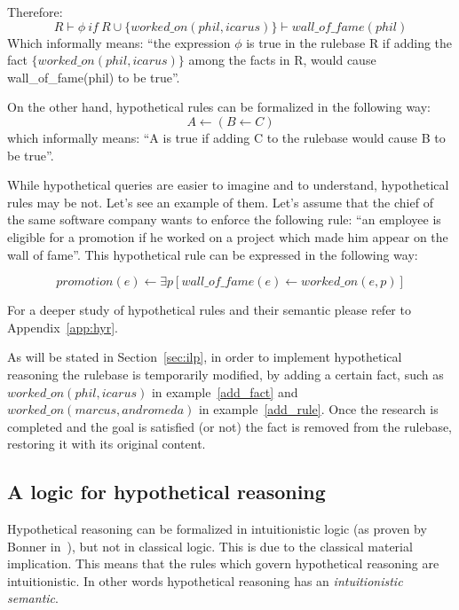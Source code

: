 Therefore:
\begin{equation}
  \label{add_fact}
  R \vdash \phi\ if\   R \cup \{worked\_on(phil, icarus)\} \vdash wall\_of\_fame(phil)
\end{equation}
Which informally means: ``the expression $\phi$ is true in the rulebase R if
adding the fact $\{worked\_on(phil, icarus)\}$ among the facts in R, would cause wall\_of\_fame(phil)
to be true''.

On the other hand, hypothetical rules can be formalized in the following way:
\begin{equation}
  A \leftarrow (B \leftarrow C)
\end{equation}
which informally means: ``A is true if adding C to the rulebase would cause B to be true''.

While hypothetical queries are easier to imagine and to understand, hypothetical rules may be not.
Let's see an example of them. Let's assume that the chief of the same software company
wants to enforce the following rule: ``an employee is eligible for a promotion if
he worked on a project which made him appear on the wall of fame''. This
hypothetical rule can be expressed in the following way:

\begin{equation}
  \label{add_rule}
  promotion(e) \leftarrow \exists p [wall\_of\_fame(e) \leftarrow worked\_on(e, p)]
\end{equation}

For a deeper study of hypothetical rules and their semantic please refer to Appendix~\ref{app:hyr}.

As will be stated in Section~\ref{sec:ilp}, in order to implement hypothetical reasoning
the rulebase is temporarily modified, by adding a certain fact, such as $worked\_on(phil, icarus)$
in example~\ref{add_fact} and $worked\_on(marcus, andromeda)$ in example~\ref{add_rule}.
Once the research is completed and the goal is satisfied (or not) the
fact is removed from the rulebase, restoring it with its original content.

\subsection{A logic for hypothetical reasoning}
\label{sec:alfhr}
Hypothetical reasoning can be formalized in intuitionistic logic (as proven by
Bonner in~\cite{Bonner88alogic}), but not in classical logic. This is due to the
classical material implication. This means that the rules which govern hypothetical
reasoning are intuitionistic. In other words hypothetical reasoning has an
\textit{intuitionistic semantic}.

